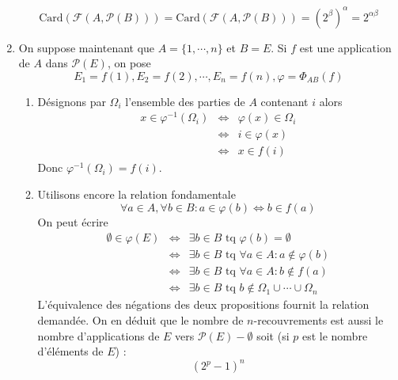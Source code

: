 \begin{enumerate}
  \[\textrm{Card}(\mathcal{F}(A,\mathcal{P}(B)))=\textrm{Card}(\mathcal{F}(A,\mathcal{P}(B)))
  =(2^\beta)^\alpha=2^{\alpha \beta}\]
  \item On suppose maintenant que $A=\{1,\cdots , n\}$
    et $B=E$. Si $f$ est une application de $A$ dans
    $\mathcal{P}(E)$, on pose
    \[E_1=f(1),E_2=f(2),\cdots, E_n=f(n), \varphi=\Phi_{AB}(f)\]
     \begin{enumerate}
        \item D{\'e}signons par $\Omega_i$ l'ensemble des parties
        de $A$ contenant $i$ alors
        \begin{eqnarray*}
        x\in \varphi ^{-1}(\Omega_i) & \Leftrightarrow &
        \varphi(x)\in \Omega_i \\
        & \Leftrightarrow & i\in \varphi (x) \\
        & \Leftrightarrow & x \in f(i)
        \end{eqnarray*}
        Donc $\varphi ^{-1}(\Omega_i)=f(i)$.
        \item Utilisons encore la relation fondamentale
        \[\forall a \in A, \forall b \in B : a\in \varphi (b) \Leftrightarrow b\in f(a)\]
        On peut {\'e}crire
        \begin{eqnarray*}
        \emptyset \in \varphi(E) & \Leftrightarrow & \exists b \in
        B \textrm{ tq }\varphi(b)=\emptyset \\
        & \Leftrightarrow & \exists b \in
        B \textrm{ tq } \forall a \in A : a\not \in \varphi(b)\\
        & \Leftrightarrow & \exists b \in
        B \textrm{ tq } \forall a \in A : b\not \in f(a)\\
        & \Leftrightarrow & \exists b \in
        B \textrm{ tq } b\not \in \Omega_1 \cup \cdots \cup
        \Omega_n
        \end{eqnarray*}
        L'{\'e}quivalence des n{\'e}gations des deux propositions fournit
        la relation demand{\'e}e.\newline
        On en d{\'e}duit que le nombre de $n$-recouvrements est aussi
        le nombre d'applications de $E$ vers
        $\mathcal{P}(E)-{\emptyset}$ soit (si $p$ est le nombre
        d'{\'e}l{\'e}ments de $E$) :
        \[(2^p-1)^n\]
     \end{enumerate}
\end{enumerate}
